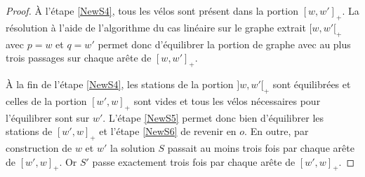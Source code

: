 \begin{proof}
\`A l'étape \ref{NewS4}, tous les vélos sont présent dans la portion $[w,w']_+$. La résolution à l'aide de l'algorithme du cas linéaire sur le graphe extrait $[w,w'[_+$ avec $p=w$ et $q=w'$ permet donc d'équilibrer la portion de graphe avec au plus trois passages sur chaque arête de $[w,w']_+$.

\`A la fin de l'étape \ref{NewS4}, les stations de la portion $]w,w'[_+$ sont équilibrées et celles de la portion $[w',w]_+$ sont vides et tous les vélos nécessaires pour l'équilibrer sont sur $w'$. L'étape \ref{NewS5} permet donc bien d'équilibrer les stations de $[w',w]_+$ et l'étape \ref{NewS6} de revenir en $o$. En outre, par construction de $w$ et $w'$ la solution $S$ passait au moins trois fois par chaque arête de $[w',w]_+$. Or $S'$ passe exactement trois fois par chaque arête de $[w',w]_+$.
\end{proof}